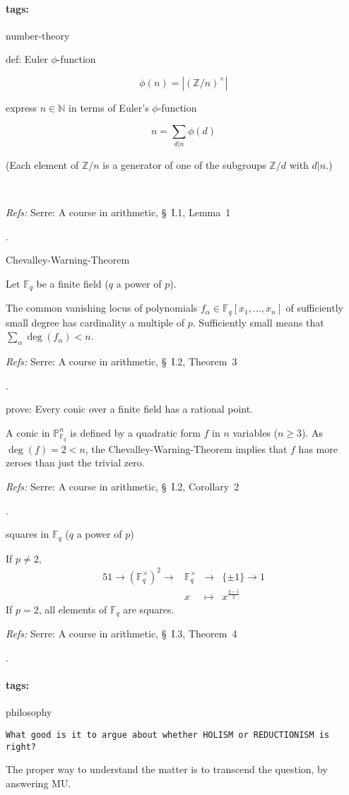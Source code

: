 \documentclass[12pt]{article}
\newcommand{\detail}[1]{{\scriptsize(#1)\par}~}
\newcommand{\refs}[1]{{\scriptsize\textit{Refs: }#1\par}\hfill.}
\newcommand*{\abs}[1]{\left\vert#1\right\vert}
\newcommand*{\NN}{\mathbb{N}}
\newcommand*{\ZZ}{\mathbb{Z}}
\newcommand*{\FF}{\mathbb{F}}
\newcommand*{\PP}{\mathbb{P}}
\newcommand*{\units}{\times}
\newcommand*{\tags}[1]{\paragraph{tags: }#1\bigskip}
\newcommand*{\xfield}[1]{\begin{mdframed}\centering #1\end{mdframed}\bigskip}
\newenvironment{field}{}{}
\newcommand*{\xplain}[1]{\begin{mdframed}\texttt{#1}\end{mdframed}\bigskip}
\newenvironment{plain}{\ttfamily}{\par}
\newenvironment{note}{}{}
\begin{document}
\tags{number-theory}
\begin{note}
  \xfield{def: Euler \(\phi\)-function}
  \begin{field}
    \[
      \phi(n) = \abs{(\ZZ/n)^\units}
    \]
  \end{field}
\end{note}

\begin{note}
  \xfield{express \(n\in\NN\) in terms of Euler's \(\phi\)-function}
  \begin{field}
    \[n=\sum_{d|n} \phi(d)\]
    
    \detail{Each element of \(\ZZ/n\) is a generator of one of the subgroups \(\ZZ/d\) with \(d|n\).}

    \refs{Serre: A course in arithmetic, \S~I.1, Lemma~1}
  \end{field}
\end{note}

\begin{note}
  \xfield{Chevalley-Warning-Theorem}
  \begin{field}
    Let \(\FF_q\) be a finite field (\(q\) a power of \(p\)).

    The common vanishing locus of polynomials \(f_{\alpha} \in \FF_q[x_1,\dots,x_n]\) of sufficiently small degree has cardinality a multiple of \(p\).  Sufficiently small means that \(\sum_\alpha \deg(f_\alpha) < n\).\\

    \refs{Serre: A course in arithmetic, \S~I.2, Theorem~3}
  \end{field}
\end{note}

\begin{note}
  \xfield{prove: Every conic over a finite field has a rational point.}
  \begin{field}
    A conic in \(\PP^n_{\FF_q}\) is defined by a quadratic form \(f\) in \(n\) variables (\(n\geq 3\)). 
    As \(\deg(f) = 2 < n\), the Chevalley-Warning-Theorem implies that \(f\) has more zeroes than just the trivial zero.\\

    \refs{Serre: A course in arithmetic, \S~I.2, Corollary~2}
  \end{field}
\end{note}

\begin{note}
  \xfield{squares in \(\FF_q\)  (\(q\) a power of \(p\))}
  \begin{field}
    If \(p\neq 2\), 
    \begin{alignat*}{5}
      1  \to  (\FF_q^\units)^2 \to 
      &\FF_q^\units & \to & \{\pm 1\} \to 1 \\
      & x          & \mapsto & x^{\frac{q-1}{2}}
    \end{alignat*}
    If \(p=2\), all elements of \(\FF_q\) are squares.\\

    \refs{Serre: A course in arithmetic, \S~I.3, Theorem~4}
  \end{field}
\end{note}

\tags{philosophy}
\begin{note}
  \xplain{What good is it to argue about whether HOLISM or REDUCTIONISM is right?}
  \begin{plain}
    The proper way to understand the matter is to transcend the question, by answering MU.
  \end{plain}
\end{note}
\end{document}
